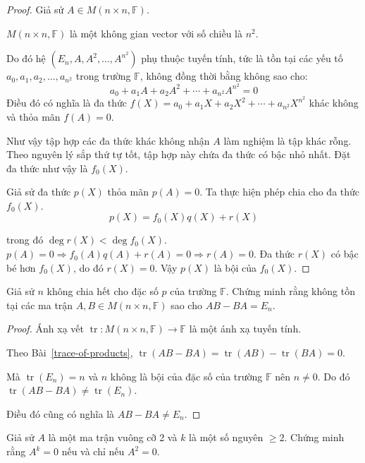 \begin{proof}
    Giả sử $A\in M(n\times n,\mathbb{F})$.
    
    $M(n\times n,\mathbb{F})$ là một không gian vector với số chiều là $n^{2}$.
    
    Do đó hệ $(E_{n}, A, A^{2}, \ldots, A^{n^{2}})$ phụ thuộc tuyến tính, tức là tồn tại các yếu tố $a_{0}, a_{1}, a_{2}, \ldots, a_{n^{2}}$ trong trường $\mathbb{F}$, không đồng thời bằng không sao cho:
    \[
        a_{0} + a_{1}A + a_{2}A^{2} + \cdots + a_{n^{2}}A^{n^{2}} = 0
    \]
    Điều đó có nghĩa là đa thức $f(X) = a_{0} + a_{1}X + a_{2}X^{2} + \cdots + a_{n^{2}}X^{n^{2}}$ khác không và thỏa mãn $f(A) = 0$.
    
    Như vậy tập hợp các đa thức khác không nhận $A$ làm nghiệm là tập khác rỗng. Theo nguyên lý sắp thứ tự tốt, tập hợp này chứa đa thức có bậc nhỏ nhất. Đặt đa thức như vậy là $f_{0}(X)$.
    
    Giả sử đa thức $p(X)$ thỏa mãn $p(A) = 0$. Ta thực hiện phép chia cho đa thức $f_{0}(X)$.
    \[
        p(X) = f_{0}(X)q(X) + r(X)
    \]
    
    trong đó $\deg r(X) < \deg f_{0}(X)$. $p(A) = 0\Rightarrow f_{0}(A)q(A) + r(A) = 0 \Rightarrow r(A) = 0$. Đa thức $r(X)$ có bậc bé hơn $f_{0}(X)$, do đó $r(X) = 0$. Vậy $p(X)$ là bội của $f_{0}(X)$.
\end{proof}

\begin{exercise}
    Giả sử $n$ không chia hết cho đặc số $p$ của trường $\mathbb{F}$. Chứng minh rằng không tồn tại các ma trận $A, B\in M(n\times n, \mathbb{F})$ sao cho $AB - BA = E_{n}$.
\end{exercise}

\begin{proof}
    Ánh xạ vết $\operatorname{tr}: M(n\times n, \mathbb{F})\rightarrow \mathbb{F}$ là một ánh xạ tuyến tính.
    
    Theo Bài~\ref{trace-of-products}, $\operatorname{tr}(AB - BA) = \operatorname{tr}(AB) - \operatorname{tr}(BA) = 0$.
    
    Mà $\operatorname{tr}(E_{n}) = n$ và $n$ không là bội của đặc số của trường $\mathbb{F}$ nên $n\ne 0$. Do đó $\operatorname{tr}(AB - BA)\ne \operatorname{tr}(E_{n})$.
    
    Điều đó cũng có nghĩa là $AB - BA \ne E_{n}$.
\end{proof}

\begin{exercise}
    Giả sử $A$ là một ma trận vuông cỡ 2 và $k$ là một số nguyên $\ge 2$. Chứng minh rằng $A^{k} = 0$ nếu và chỉ nếu $A^{2} = 0$.
\end{exercise}

